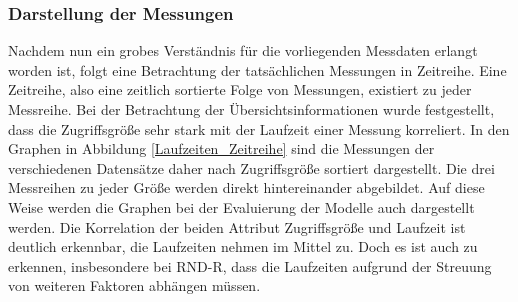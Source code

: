 \documentclass[
	twoside,
	12pt,
	a4paper,
	BCOR10mm,
	DIV14,
	listof=totoc,
	bibliography=totoc,
	headsepline
]{scrreprt}
\begin{document}
\subsubsection{Darstellung der Messungen}
Nachdem nun ein grobes Verständnis für die vorliegenden Messdaten erlangt worden ist, folgt eine Betrachtung der tatsächlichen Messungen in Zeitreihe.
Eine Zeitreihe, also eine zeitlich sortierte Folge von Messungen, existiert zu jeder Messreihe.
Bei der Betrachtung der Übersichtsinformationen wurde festgestellt, dass die Zugriffsgröße sehr stark mit der Laufzeit einer Messung korreliert.
In den Graphen in Abbildung \ref{Laufzeiten_Zeitreihe} sind die Messungen der verschiedenen Datensätze daher nach Zugriffsgröße sortiert dargestellt. Die drei Messreihen zu jeder Größe werden direkt hintereinander abgebildet. Auf diese Weise werden die Graphen bei der Evaluierung der Modelle auch dargestellt werden.
Die Korrelation der beiden Attribut Zugriffsgröße und Laufzeit ist deutlich erkennbar, die Laufzeiten nehmen im Mittel zu. Doch es ist auch zu erkennen, insbesondere bei RND-R, dass die Laufzeiten aufgrund der Streuung von weiteren Faktoren abhängen müssen.\medskip
\end{document}
